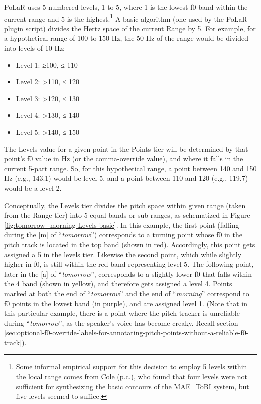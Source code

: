 \documentclass[11pt, twoside]{memoir}
\def\langtext#1{\textit{#1}}
\begin{document}
PoLaR uses 5 numbered levels, 1 to 5, where 1 is the lowest f0 band within the current range and 5 is the highest.\footnote{Some informal empirical support for this decision to employ 5 levels within the local range comes from Cole (p.c.), who found that four levels were not sufficient for synthesizing the basic contours of the MAE\_ToBI system, but five levels seemed to suffice.} A basic algorithm (one used by the PoLaR plugin script) divides the Hertz space of the current Range by 5. For example, for a hypothetical range of 100 to 150 Hz, the 50 Hz of the range would be divided into levels of 10 Hz:

\begin{itemize}
\item Level 1: ≥100, ≤ 110
\item Level 2: >110, ≤ 120
\item Level 3: >120, ≤ 130
\item Level 4: >130, ≤ 140
\item Level 5: >140, ≤ 150 \end{itemize}

The Levels value for a given point in the Points tier will be determined by that point’s f0 value in Hz (or the comma-override value), and where it falls in the current 5-part range. So, for this hypothetical range, a point between 140 and 150 Hz (e.g., 143.1) would be level 5, and a point between 110 and 120 (e.g., 119.7) would be a level 2.

Conceptually, the Levels tier divides the pitch space within given range (taken from the Range tier) into 5 equal bands or sub-ranges, as schematized in Figure \ref{fig:tomorrow_morning Levels basic}. In this example, the first point (falling during the [m] of “\langtext{tomorrow}”) corresponds to a turning point whose f0 in the pitch track is located in the top band (shown in red). Accordingly, this point gets assigned a 5 in the levels tier. Likewise the second point, which while slightly higher in f0, is still within the red band representing level 5. The following point, later in the [a] of “\langtext{tomorrow}”, corresponds to a slightly lower f0 that falls within the 4 band (shown in yellow), and therefore gets assigned a level 4. Points marked at both the end of “\langtext{tomorrow}” and the end of “\langtext{morning}” correspond to f0 points in the lowest band (in purple), and are assigned level 1. (Note that in this particular example, there is a point where the pitch tracker is unreliable during “\langtext{tomorrow}”, as the speaker’s voice has become creaky. Recall section \ref{sec:optional-f0-override-labels-for-annotating-pitch-points-without-a-reliable-f0-track}).
\end{document}
